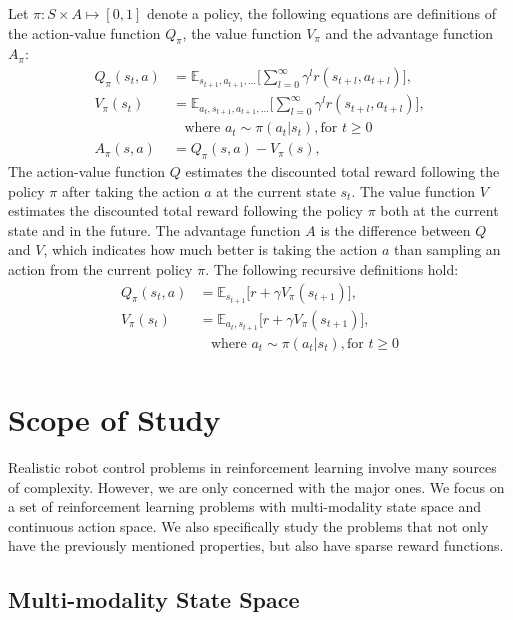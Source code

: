 Let $\pi : S \times A \mapsto [0,1] $ denote a policy, the following equations are definitions of the action-value function $Q_\pi $, the value function $V_\pi $ and the advantage function $A_\pi $:
\begin{align}
Q_\pi(s_t,a) &= \mathbb{E}_{s_{t+1},a_{t+1},\ldots}
\big[ \sum_{l=0}^\infty \gamma^l r(s_{t+l},a_{t+l}) \big], \\
V_\pi(s_t) &= \mathbb{E}_{a_{t},s_{t+1},a_{t+1},\ldots}
\big[ \sum_{l=0}^\infty \gamma^l  r(s_{t+l},a_{t+l}) \big],\\
& \ \ \ \ \text{where } a_t \sim \pi (a_t|s_t), \text{for } t \geq 0  \\
A_\pi (s,a) &= Q_\pi (s,a) - V_\pi (s), 
\end{align}
The action-value function $Q$ estimates the discounted total reward following the policy $\pi$ after taking the action $a$ at the current state $s_t$. The value function $V$ estimates the discounted total reward following the policy $\pi$ both at the current state and in the future. The advantage function $A$ is the difference between $Q$ and $V$, which indicates how much better is taking the action $a$ than sampling an action from the current policy $\pi$.
The following recursive definitions hold:
\begin{align}
Q_\pi(s_t,a) &= \mathbb{E}_{s_{t+1}}
\big[ r + \gamma V_\pi(s_{t+1}) \big], \\
V_\pi(s_t) &= \mathbb{E}_{a_{t},s_{t+1}}
\big[ r + \gamma V_\pi(s_{t+1}) \big],\\
& \ \ \ \ \text{where } a_t \sim \pi (a_t|s_t), \text{for } t \geq 0  \\
\end{align}



\section{Scope of Study}
Realistic robot control problems in reinforcement learning involve many sources of complexity. However, we are only concerned with the major ones.
We focus on a set of reinforcement learning problems with multi-modality state space and continuous action space. We also specifically study the problems that not only have the previously mentioned properties, but also have sparse reward functions.

\subsection{Multi-modality State Space}


